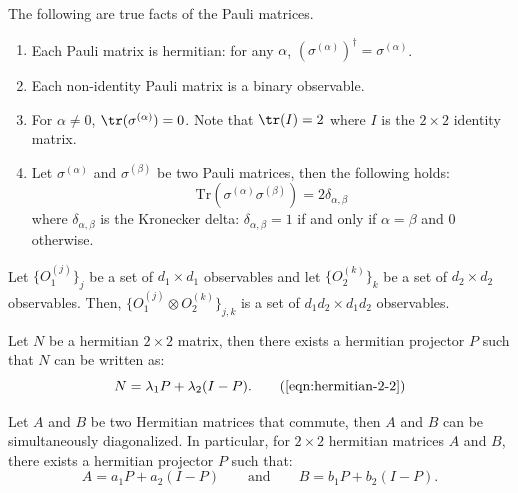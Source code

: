 \begin{fact}\label{fact:pauli-properties}The following are true facts of the Pauli matrices.
\begin{enumerate}
    \item Each Pauli matrix is hermitian: for any $\alpha$, ${\left(\sigma^{(\alpha)}\right)}^\dagger = \sigma^{(\alpha)}$.
    \item Each non-identity Pauli matrix is a binary observable.
    \item For $\alpha \neq 0$, $\tr(\sigma^{(\alpha)}) = 0$. Note that $\tr(I) = 2$ where $I$ is the $2 \times 2$ identity matrix.
    \item\label{trace-of-product-of-paulis} Let $\sigma^{(\alpha)}$ and $\sigma^{(\beta)}$ be two Pauli matrices, then the following holds:
    \begin{equation}
        \mathrm{Tr}\left(\sigma^{(\alpha)} \sigma^{(\beta)}\right) = 2 \delta_{\alpha,\beta}
    \end{equation}
where $\delta_{\alpha,\beta}$ is the Kronecker delta: $\delta_{\alpha,\beta} = 1$ if and only if $\alpha = \beta$ and $0$ otherwise.
\end{enumerate}

\end{fact}

\begin{fact}\label{fact:tensor-product-observables}
    Let $\{O_1^{(j)}\}_j$ be a set of $d_1 \times d_1$ observables and let $\{O_2^{(k)}\}_k$ be a set of $d_2 \times d_2$ observables. Then, $\{O_1^{(j)} \otimes O_2^{(k)}\}_{j,k}$ is a set of $d_1 d_2 \times d_1 d_2$ observables.
\end{fact}

\begin{fact}
    Let $N$ be a hermitian $2 \times 2$ matrix, then there exists a hermitian projector $P$ such that $N$ can be written as:
    \begin{equation}
        N = \lambda_1 P + \lambda_2 (I - P). \tag{\ref{eqn:hermitian-2-2}}
    \end{equation}
\end{fact}

\begin{fact}\label{fact:sim-diag}
    Let $A$ and $B$ be two Hermitian matrices that commute, then $A$ and $B$ can be simultaneously diagonalized. In particular, for $2 \times 2$ hermitian matrices $A$ and $B$, there exists a hermitian projector $P$ such that:
    \begin{equation}
        A = a_1 P + a_2 (I -P) \quad\quad \text{and} \quad\quad B = b_1 P + b_2 (I - P).
    \end{equation}
\end{fact}

